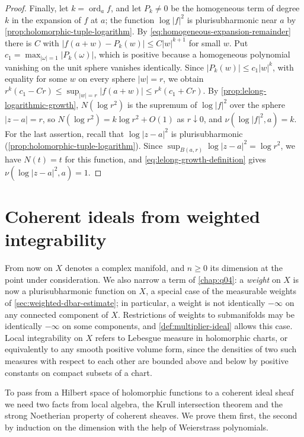 \begin{proof}
Finally, let $k=\operatorname{ord}_af$, and let $P_k\neq0$ be the homogeneous term of degree $k$ in the expansion of $f$ at $a$; the function $\log|f|^2$ is plurisubharmonic near $a$ by \cref{prop:holomorphic-tuple-logarithm}. By \eqref{eq:homogeneous-expansion-remainder} there is $C$ with $|f(a+w)-P_k(w)|\leq C|w|^{k+1}$ for small $w$. Put $c_1=\max_{|\omega|=1}|P_k(\omega)|$, which is positive because a homogeneous polynomial vanishing on the unit sphere vanishes identically. Since $|P_k(w)|\leq c_1|w|^k$, with equality for some $w$ on every sphere $|w|=r$, we obtain $r^k(c_1-Cr)\leq\sup_{|w|=r}|f(a+w)|\leq r^k(c_1+Cr)$. By \cref{prop:lelong-logarithmic-growth}, $N(\log r^2)$ is the supremum of $\log|f|^2$ over the sphere $|z-a|=r$, so $N(\log r^2)=k\log r^2+O(1)$ as $r\downarrow0$, and $\nu(\log|f|^2,a)=k$. For the last assertion, recall that $\log|z-a|^2$ is plurisubharmonic (\cref{prop:holomorphic-tuple-logarithm}). Since $\sup_{B(a,r)}\log|z-a|^2=\log r^2$, we have $N(t)=t$ for this function, and \eqref{eq:lelong-growth-definition} gives $\nu(\log|z-a|^2,a)=1$.
\end{proof}

\section{Coherent ideals from weighted integrability}
\label{sec:multiplier-ideal-coherence}

From now on $X$ denotes a complex manifold, and $n\geq0$ its dimension at the point under consideration. We also narrow a term of \cref{chap:q04}: a \emph{weight} on $X$ is now a plurisubharmonic function on $X$, a special case of the measurable weights of \cref{sec:weighted-dbar-estimate}; in particular, a weight is not identically $-\infty$ on any connected component of $X$. Restrictions of weights to submanifolds may be identically $-\infty$ on some components, and \cref{def:multiplier-ideal} allows this case. Local integrability on $X$ refers to Lebesgue measure in holomorphic charts, or equivalently to any smooth positive volume form, since the densities of two such measures with respect to each other are bounded above and below by positive constants on compact subsets of a chart.

To pass from a Hilbert space of holomorphic functions to a coherent ideal sheaf we need two facts from local algebra, the Krull intersection theorem and the strong Noetherian property of coherent sheaves. We prove them first, the second by induction on the dimension with the help of Weierstrass polynomials.

